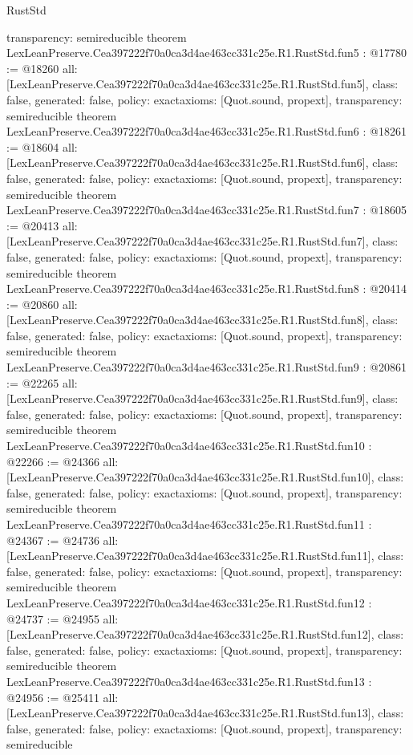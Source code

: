 \begin{lexlean}{RustStd}
\begin{coremodule}
{  transparency: semireducible
}
theorem LexLeanPreserve.Cea397222f70a0ca3d4ae463cc331c25e.R1.RustStd.fun5 : @17780 := @18260 {
  all: [LexLeanPreserve.Cea397222f70a0ca3d4ae463cc331c25e.R1.RustStd.fun5],
  class: false,
  generated: false,
  policy: exact{axioms: [Quot.sound, propext]},
  transparency: semireducible
}
theorem LexLeanPreserve.Cea397222f70a0ca3d4ae463cc331c25e.R1.RustStd.fun6 : @18261 := @18604 {
  all: [LexLeanPreserve.Cea397222f70a0ca3d4ae463cc331c25e.R1.RustStd.fun6],
  class: false,
  generated: false,
  policy: exact{axioms: [Quot.sound, propext]},
  transparency: semireducible
}
theorem LexLeanPreserve.Cea397222f70a0ca3d4ae463cc331c25e.R1.RustStd.fun7 : @18605 := @20413 {
  all: [LexLeanPreserve.Cea397222f70a0ca3d4ae463cc331c25e.R1.RustStd.fun7],
  class: false,
  generated: false,
  policy: exact{axioms: [Quot.sound, propext]},
  transparency: semireducible
}
theorem LexLeanPreserve.Cea397222f70a0ca3d4ae463cc331c25e.R1.RustStd.fun8 : @20414 := @20860 {
  all: [LexLeanPreserve.Cea397222f70a0ca3d4ae463cc331c25e.R1.RustStd.fun8],
  class: false,
  generated: false,
  policy: exact{axioms: [Quot.sound, propext]},
  transparency: semireducible
}
theorem LexLeanPreserve.Cea397222f70a0ca3d4ae463cc331c25e.R1.RustStd.fun9 : @20861 := @22265 {
  all: [LexLeanPreserve.Cea397222f70a0ca3d4ae463cc331c25e.R1.RustStd.fun9],
  class: false,
  generated: false,
  policy: exact{axioms: [Quot.sound, propext]},
  transparency: semireducible
}
theorem LexLeanPreserve.Cea397222f70a0ca3d4ae463cc331c25e.R1.RustStd.fun10 : @22266 := @24366 {
  all: [LexLeanPreserve.Cea397222f70a0ca3d4ae463cc331c25e.R1.RustStd.fun10],
  class: false,
  generated: false,
  policy: exact{axioms: [Quot.sound, propext]},
  transparency: semireducible
}
theorem LexLeanPreserve.Cea397222f70a0ca3d4ae463cc331c25e.R1.RustStd.fun11 : @24367 := @24736 {
  all: [LexLeanPreserve.Cea397222f70a0ca3d4ae463cc331c25e.R1.RustStd.fun11],
  class: false,
  generated: false,
  policy: exact{axioms: [Quot.sound, propext]},
  transparency: semireducible
}
theorem LexLeanPreserve.Cea397222f70a0ca3d4ae463cc331c25e.R1.RustStd.fun12 : @24737 := @24955 {
  all: [LexLeanPreserve.Cea397222f70a0ca3d4ae463cc331c25e.R1.RustStd.fun12],
  class: false,
  generated: false,
  policy: exact{axioms: [Quot.sound, propext]},
  transparency: semireducible
}
theorem LexLeanPreserve.Cea397222f70a0ca3d4ae463cc331c25e.R1.RustStd.fun13 : @24956 := @25411 {
  all: [LexLeanPreserve.Cea397222f70a0ca3d4ae463cc331c25e.R1.RustStd.fun13],
  class: false,
  generated: false,
  policy: exact{axioms: [Quot.sound, propext]},
  transparency: semireducible
}
\end{coremodule}
\end{lexlean}

